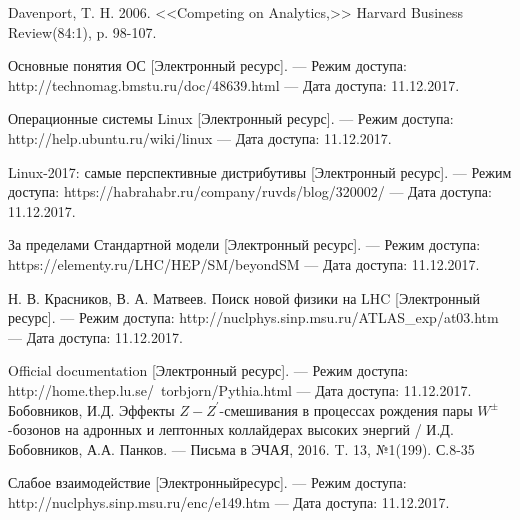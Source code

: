 

	Davenport, T. H. 2006. <<Competing on Analytics,>> Harvard
	Business Review(84:1), p. 98-107.

	Основные понятия ОС 
	[Электронный ресурс].
	 — Режим досту­па: http://technomag.bmstu.ru/doc/48639.html
	 — Дата доступа: 11.12.2017.

	Операционные системы Linux 
	[Электронный ресурс].
	 — Ре­жим доступа: http://help.ubuntu.ru/wiki/linux
	 — Дата доступа: 11.12.2017.
	 
	 Linux-2017: самые перспективные дистрибутивы  
	 [Электронный ресурс].
	 — Ре­жим доступа: https://habrahabr.ru/company/ruvds/blog/320002/
	 — Дата доступа: 11.12.2017.

	За пределами Стандартной модели
	[Электронный ресурс].
	 — Режим доступа: https://elementy.ru/LHC/HEP/SM/beyondSM 
	 — Да­та доступа: 11.12.2017.


	Н. В. Красников, В. А. 
	Матвеев. Поиск новой физики на LHC
	[Электронный ресурс].
	 — Режим доступа: http://nuclphys.sinp.msu.ru/ATLAS\_exp/at03.htm 
	 — Дата доступа: 11.12.2017.
	 
	 Official documentation
	 [Электронный ресурс].
	 — Режим доступа: http://home.thep.lu.se/~torbjorn/Pythia.html 
	 — Дата доступа: 11.12.2017.
	Бобовников, И.Д. Эффекты $Z-Z^\prime$-смешивания в процессах рождения пары $W^±$-бозонов на адронных и лептонных коллайдерах высоких энергий
	/ И.Д. Бобовников, А.А. Панков.
	— Письма в ЭЧАЯ, 2016. T. 13, №1(199). С.8-35
	
	Слабое взаимодействие 
	[Электронныйресурс].
	— Режим доступа: http://nuclphys.sinp.msu.ru/enc/e149.htm
	— Дата доступа: 11.12.2017.

	 
